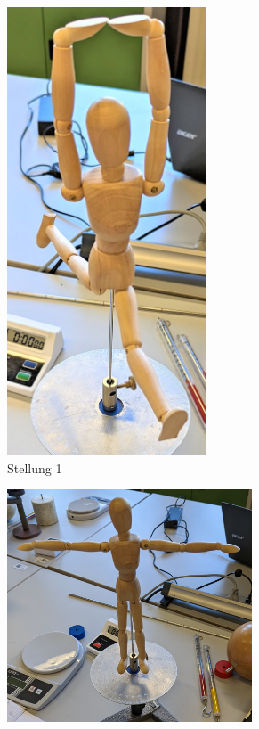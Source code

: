 \begin{figure}
    \centering
    \begin{subfigure}{0.4\textwidth}
        \centering
        \includegraphics[width=0.65\textwidth]{content/Ballet3.jpg}
        \caption{Stellung 1}
        \label{fig:D_Holzpuppe1}
    \end{subfigure}
    \hfill
    \begin{subfigure}{0.48\textwidth}
        \centering
        \includegraphics[width=0.8\textwidth]{content/T_Pose3.jpg}

\end{subfigure}
\end{figure}
